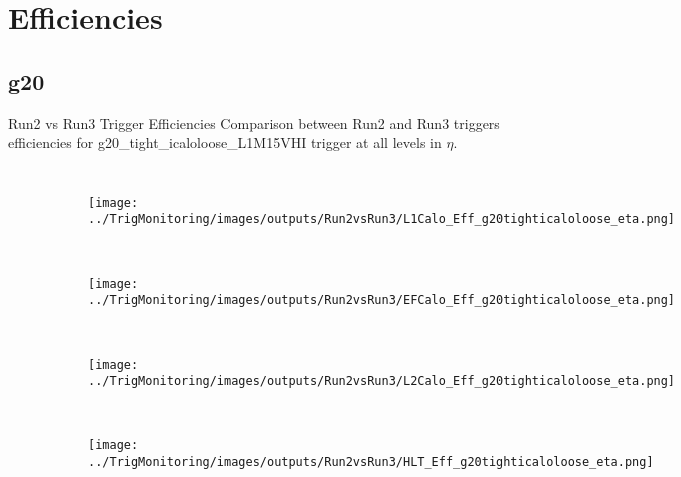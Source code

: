 \documentclass[aspectratio=1610,8pt]{beamer}					%
\begin{document}
\section{Efficiencies}
\subsection{g20}
\begin{frame}{Run2 vs Run3 Trigger Efficiencies}
    Comparison between Run2 and Run3 triggers efficiencies for g20\_tight\_icaloloose\_L1M15VHI trigger at all levels in $\eta$.
    \begin{columns}
        \begin{figure}[h!]
            \begin{subfigure}[b]{0.45\textwidth}
                \centering
                \texttt{[image: ../TrigMonitoring/images/outputs/Run2vsRun3/L1Calo\_Eff\_g20tighticaloloose\_eta.png]}
                \caption{~}
            \end{subfigure}
            \begin{subfigure}[b]{0.45\textwidth}
                \centering
                \texttt{[image: ../TrigMonitoring/images/outputs/Run2vsRun3/EFCalo\_Eff\_g20tighticaloloose\_eta.png]}
                \caption{~}
            \end{subfigure}
            \begin{subfigure}[b]{0.45\textwidth}
                \centering
                \texttt{[image: ../TrigMonitoring/images/outputs/Run2vsRun3/L2Calo\_Eff\_g20tighticaloloose\_eta.png]}
                \caption{~}
            \end{subfigure}
            \begin{subfigure}[b]{0.45\textwidth}
                \centering
                \texttt{[image: ../TrigMonitoring/images/outputs/Run2vsRun3/HLT\_Eff\_g20tighticaloloose\_eta.png]}
                \caption{~}
            \end{subfigure}
        \end{figure}


\end{columns}
\end{frame}
\end{document}
